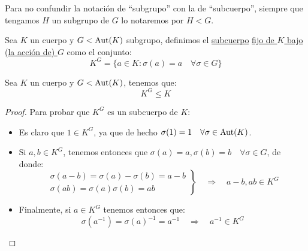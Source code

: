 \begin{notacion}
    Para no confundir la notación de ``subgrupo'' con la de ``subcuerpo'', siempre que tengamos $H$ un subgrupo de $G$ lo notaremos por $H < G$.
\end{notacion}


\begin{definicion}
    Sea $K$ un cuerpo y $G< \operatorname{Aut}(K)$ subgrupo, definimos el \underline{subcuerpo} \underline{fijo de $K$ bajo (la acción de) $G$} como el conjunto:
    \begin{equation*}
        K^G = \{a\in K : \sigma(a) = a \quad \forall \sigma\in G\}
    \end{equation*}
\end{definicion}

\begin{observacion}
    Sea $K$ un cuerpo y $G<\operatorname{Aut}(K)$, tenemos que:
    \begin{equation*}
        K^G \leq K
    \end{equation*}
    \begin{proof}
        Para probar que $K^G$ es un subcuerpo de $K$:
        \begin{itemize}
            \item Es claro que $1\in K^G$, ya que de hecho $\sigma(1) = 1\quad \forall \sigma\in \operatorname{Aut}(K)$.
            \item Si $a,b\in K^G$, tenemos entonces que $\sigma(a) = a, \sigma(b)=b\quad \forall \sigma\in G$, de donde:
                \begin{equation*}
                    \left.\begin{array}{r}
                        \sigma(a-b) = \sigma(a)-\sigma(b) = a-b \\
                        \sigma(ab) = \sigma(a)\sigma(b) = ab
                    \end{array}\right\} \quad\Longrightarrow\quad a-b,ab\in K^G
                \end{equation*}
            \item Finalmente, si $a\in K^G$ tenemos entonces que:
                \begin{equation*}
                    \sigma(a^{-1}) = \sigma(a)^{-1} = a^{-1} \quad\Longrightarrow\quad a^{-1}\in K^G
                \end{equation*}
        \end{itemize}
    \end{proof}
\end{observacion}
 
